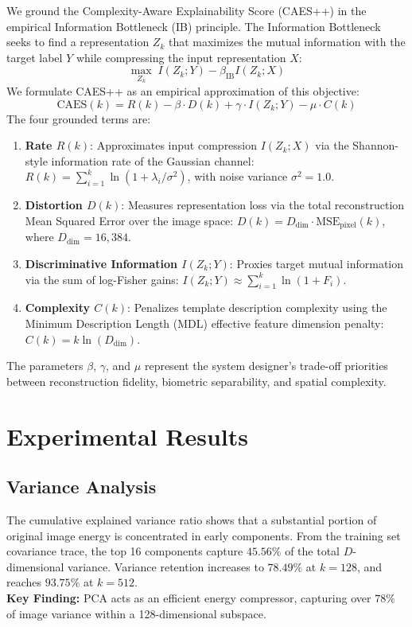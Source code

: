 \documentclass[conference]{IEEEtran}
\begin{document}
We ground the Complexity-Aware Explainability Score (CAES++) in the empirical Information Bottleneck (IB) principle. The Information Bottleneck seeks to find a representation $Z_k$ that maximizes the mutual information with the target label $Y$ while compressing the input representation $X$:
\begin{equation}
    \max_{Z_k} \; I(Z_k; Y) - \beta_{\text{IB}} I(Z_k; X)
    \label{eq:ib}
\end{equation}
We formulate CAES++ as an empirical approximation of this objective:
\begin{equation}
    \text{CAES}(k) = R(k) - \beta \cdot D(k) + \gamma \cdot I(Z_k; Y) - \mu \cdot C(k)
    \label{eq:caes}
\end{equation}
The four grounded terms are:
\begin{enumerate}
    \item \textbf{Rate $R(k)$}: Approximates input compression $I(Z_k; X)$ via the Shannon-style information rate of the Gaussian channel: $R(k) = \sum_{i=1}^k \ln(1 + \lambda_i / \sigma^2)$, with noise variance $\sigma^2 = 1.0$.
    \item \textbf{Distortion $D(k)$}: Measures representation loss via the total reconstruction Mean Squared Error over the image space: $D(k) = D_{\text{dim}} \cdot \text{MSE}_{\text{pixel}}(k)$, where $D_{\text{dim}} = 16,384$.
    \item \textbf{Discriminative Information $I(Z_k; Y)$}: Proxies target mutual information via the sum of log-Fisher gains: $I(Z_k; Y) \approx \sum_{i=1}^k \ln(1 + F_i)$.
    \item \textbf{Complexity $C(k)$}: Penalizes template description complexity using the Minimum Description Length (MDL) effective feature dimension penalty: $C(k) = k \ln(D_{\text{dim}})$.
\end{enumerate}
The parameters $\beta$, $\gamma$, and $\mu$ represent the system designer's trade-off priorities between reconstruction fidelity, biometric separability, and spatial complexity.

\section{Experimental Results}
\label{sec:results}

\subsection{Variance Analysis}
The cumulative explained variance ratio shows that a substantial portion of original image energy is concentrated in early components. From the training set covariance trace, the top 16 components capture $45.56\%$ of the total $D$-dimensional variance. Variance retention increases to $78.49\%$ at $k=128$, and reaches $93.75\%$ at $k=512$. 
\\
\textbf{Key Finding:} PCA acts as an efficient energy compressor, capturing over $78\%$ of image variance within a 128-dimensional subspace.
\end{document}

